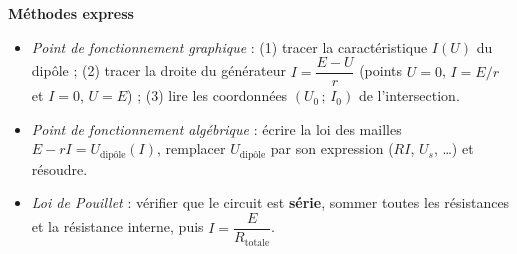 \documentclass[11pt]{article}
\begin{document}
\begin{bilan}
\textbf{M\'ethodes express}
\begin{itemize}
  \item \emph{Point de fonctionnement graphique} : (1) tracer la caract\'eristique $I(U)$ du dip\^ole ; (2) tracer la droite du g\'en\'erateur $I=\dfrac{E-U}{r}$ (points $U=0$, $I=E/r$ et $I=0$, $U=E$) ; (3) lire les coordonn\'ees $(U_0\,;\,I_0)$ de l'intersection.
  \item \emph{Point de fonctionnement alg\'ebrique} : \'ecrire la loi des mailles $E-rI=U_{\text{dip\^ole}}(I)$, remplacer $U_{\text{dip\^ole}}$ par son expression ($RI$, $U_s$, \dots) et r\'esoudre.
  \item \emph{Loi de Pouillet} : v\'erifier que le circuit est \textbf{s\'erie}, sommer toutes les r\'esistances et la r\'esistance interne, puis $I=\dfrac{E}{R_{\text{totale}}}$.
\end{itemize}
\end{bilan}
\end{document}
